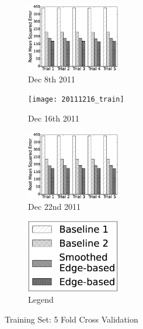 \documentclass{sig-alternate}
\begin{document}
\begin{figure}[htb]
	\centering
	\begin{subfigure}{1.6in}
		\includegraphics[width=1.6in]{20111208_train} %
		\caption{Dec 8th 2011}
		\label{fig:20111208_train}
	\end{subfigure}
	\begin{subfigure}{1.6in}
		\texttt{[image: 20111216\_train]} %
		\caption{Dec 16th 2011}
		\label{fig:20111216_train}
	\end{subfigure}
	\begin{subfigure}{1.6in}
		\includegraphics[width=1.6in]{20111222_train} %
		\caption{Dec 22nd 2011}
		\label{fig:20111222_train}
	\end{subfigure}
	\begin{subfigure}{1.6in}
		\includegraphics[width=1.6in]{legend} %
		\caption{Legend}
		\label{fig:legend_train}
	\end{subfigure}
	\caption{Training Set: 5 Fold Cross Validation}
	\label{fig:5_fold_train}
\end{figure}
\end{document}
